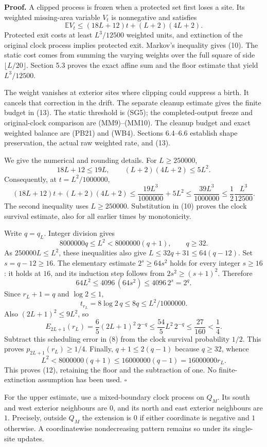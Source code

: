 \documentclass[
  11pt,
  a4paper,
]{article}
\begin{document}
\textbf{Proof.} A clipped process is frozen when a protected set first
loses a site. Its weighted missing-area variable \(V_t\) is nonnegative
and satisfies \[
\mathbb E V_t\leq(18L+12)t+(L+2)(4L+2).
\tag{13}
\] Protected exit costs at least \(L^3/12500\) weighted units, and
extinction of the original clock process implies protected exit.
Markov's inequality gives (10). The static cost comes from summing the
varying weights over the full square of side \(\lfloor L/20\rfloor\).
Section 5.3 proves the exact affine sum and the floor estimate that
yield \(L^3/12500\).

The weight vanishes at exterior sites where clipping could suppress a
birth. It cancels that correction in the drift. The separate cleanup
estimate gives the finite budget in (13). The static threshold is (SG5);
the completed-output freeze and original-clock comparison are
(MM9)--(MM10). The cleanup budget and exact weighted balance are (PB21)
and (WB4). Sections 6.4--6.6 establish shape preservation, the actual
raw weighted rate, and (13).

We give the numerical and rounding details. For \(L\geq250000\), \[
18L+12\leq19L,\qquad (L+2)(4L+2)\leq5L^2.
\] Consequently, at \(t=L^2/1000000\), \[
(18L+12)t+(L+2)(4L+2)
\leq\frac{19L^3}{1000000}+5L^2
\leq\frac{39L^3}{1000000}
\leq\frac12\frac{L^3}{12500}.
\] The second inequality uses \(L\geq250000\). Substitution in (10)
proves the clock survival estimate, also for all earlier times by
monotonicity.

Write \(q=q_L\). Integer division gives \[
8000000q\leq L^2<8000000(q+1),\qquad q\geq32.
\] As \(250000L\leq L^2\), these inequalities also give
\(L\leq32q+31\leq64(q-12)\). Set \(s=q-12\geq16\). The elementary
estimate \(2^s\geq64s^2\) holds for every integer \(s\geq16\): it holds
at \(16\), and its induction step follows from \(2s^2\geq(s+1)^2\).
Therefore \[
64L^2\leq4096\,(64s^2)\leq4096\,2^s=2^q.
\] Since \(r_L+1=q\) and \(\log2\leq1\), \[
t_{r_L}=8\log2\,q\leq8q\leq L^2/1000000.
\] Also \((2L+1)^2\leq9L^2\), so \[
E_{2L+1}(r_L)
=\frac65(2L+1)^2\,2^{-q}
\leq\frac{54}{5}L^2\,2^{-q}
\leq\frac{27}{160}<\frac14.
\] Subtract this scheduling error in (8) from the clock survival
probability \(1/2\). This proves \(p_{2L+1}(r_L)\geq1/4\). Finally,
\(q+1\leq2(q-1)\) because \(q\geq32\), whence \[
L^2<8000000(q+1)\leq16000000(q-1)=16000000r_L.
\] This proves (12), retaining the floor and the subtraction of one. No
finite-extinction assumption has been used. \(\square\)

For the upper estimate, use a mixed-boundary clock process on \(Q_M\).
Its south and west exterior neighbours are \(0\), and its north and east
exterior neighbours are \(1\). Precisely, outside \(Q_M\) the extension
is \(0\) if either coordinate is negative and \(1\) otherwise. A
coordinatewise nondecreasing pattern remains so under its single-site
updates.
\end{document}
